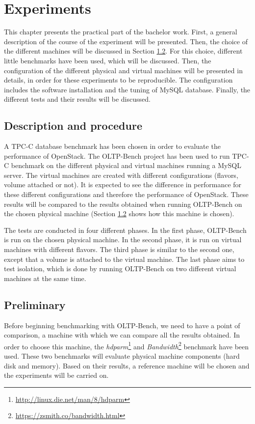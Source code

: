 

\chapter{Experiments}
This chapter presents the practical part of the bachelor work.
First, a general description of the course of the experiment will be presented.
Then, the choice of the different machines will be discussed in Section \ref{sec:preliminary}.
For this choice, different little benchmarks have been used, which will be discussed.
Then, the configuration of the different physical and virtual machines will be presented in details, in order for these experiments to be reproducible.
The configuration includes the software installation and the tuning of MySQL database.
Finally, the different tests and their results will be discussed.


\section{Description and procedure}
A TPC-C database benchmark has been chosen in order to evaluate the performance of OpenStack.
The OLTP-Bench project has been used to run TPC-C benchmark on the different physical and virtual machines running a MySQL server.
The virtual machines are created with different configurations (flavors, volume attached or not). 
It is expected to see the difference in performance for these different configurations and therefore the performance of OpenStack.
These results will be compared to the results obtained when running OLTP-Bench on the chosen physical machine (Section \ref{sec:preliminary} shows how this machine is chosen).

The tests are conducted in four different phases.
In the first phase, OLTP-Bench is run on the chosen physical machine.
In the second phase, it is run on virtual machines with different flavors.
The third phase is similar to the second one, except that a volume is attached to the virtual machine.
The last phase aims to test isolation, which is done by running OLTP-Bench on two different virtual machines at the same time.




\section{Preliminary}
\label{sec:preliminary}
Before beginning benchmarking with OLTP-Bench, we need to have a point of comparison, a machine with which we can compare all the results obtained. 
In order to choose this machine, the \textit{hdparm}\footnote{\url{http://linux.die.net/man/8/hdparm}} and \textit{Bandwidth}\footnote{\url{https://zsmith.co/bandwidth.html}} benchmark have been used. 
These two benchmarks will evaluate physical machine components (hard disk and memory).
Based on their results, a reference machine will be chosen and the experiments will be carried on.


